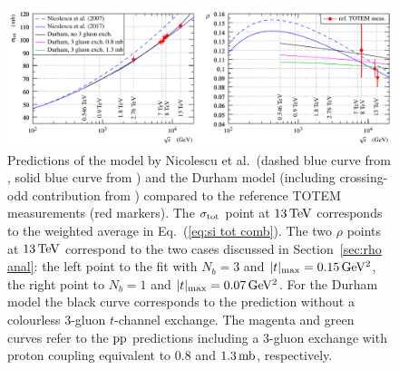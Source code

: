 \begin{figure}
\begin{center}
\includegraphics{fig/matching_models_si_tot_rho.pdf}
\caption{%
Predictions of the model by Nicolescu et al.~(dashed blue curve from \cite{nicolescu-2007}, solid blue curve from \cite{nicolescu-2017}) and the Durham model \cite{durham-2018} (including crossing-odd contribution from \cite{levin-1990}) compared to the reference TOTEM measurements (red markers). The $\sigma_{\rm tot}$ point at $13\,{\rm TeV}$ corresponds to the weighted average in Eq.~(\ref{eq:si tot comb}). The two $\rho$ points at $13\,{\rm TeV}$ correspond to the two cases discussed in Section~\ref{sec:rho anal}: the left point to the fit with $N_b=3$ and $|t|_{\rm max} = 0.15\,{\rm GeV^2}$, the right point to $N_b=1$ and $|t|_{\rm max} = 0.07\,{\rm GeV^2}$. For the Durham model the black curve corresponds to the prediction without a colourless 3-gluon $t$-channel exchange. The magenta and green curves refer to the $\rm pp$ predictions including a 3-gluon exchange with proton coupling equivalent to $0.8$ and $1.3\,{\rm mb}$, respectively.
}
\label{fig:match models}
\end{center}
\end{figure}

